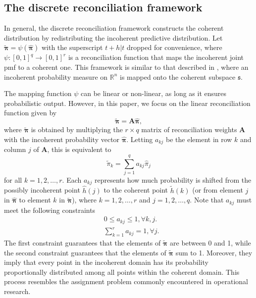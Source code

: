 \documentclass[a4paper,review,12pt,authoryear]{elsarticle}
\newcommand{\bpi}{\bm{\pi}}
\begin{document}
    \subsection{The discrete reconciliation framework}
    
    In general, the discrete reconciliation framework constructs the coherent distribution by redistributing the incoherent predictive distribution. 
    Let $\tilde{\bpi} = \psi(\hat{\bpi})$ with the superscript $t+h|t$ dropped for convenience, where $\psi:[0,1]^q \rightarrow [0,1]^r$ is a reconciliation function that maps the incoherent joint pmf to a coherent one. 
    This framework is similar to that described in \cite{panagiotelisProbabilisticForecastReconciliation2022}, where an incoherent probability measure on $\mathbb{R}^n$ is mapped onto the coherent subspace $\mathfrak{s}$.

    The mapping function $\psi$ can be linear or non-linear, as long as it ensures probabilistic output. 
    However, in this paper, we focus on the linear reconciliation function given by
    \begin{equation}
      \label{eq:framework}
    \tilde{\bpi}=\bm{A}\hat{\bpi},
    \end{equation}
    where $\tilde{\bpi}$ is obtained by multiplying the $r \times q$ matrix of reconciliation weights $\bm{A}$ with the incoherent probability vector $\hat{\bpi}$. Letting $a_{kj}$ be the element in row $k$ and column $j$ of $\bm{A}$, this is equivalent to
    \[
      \tilde{\pi}_k=\sum\limits_{j=1}^q a_{kj}\hat{{\pi}}_j
    \]
    for all $k = 1, 2, \dots, r$. 
    Each $a_{kj}$ represents how much probability is shifted from the possibly incoherent point $\hat{h}(j)$ to the coherent point $\tilde{h}(k)$ (or from element $j$ in $\hat{\bpi}$ to element $k$ in $\tilde{\bpi}$), where  $k = 1, 2, \dots, r$ and  $j = 1, 2, \dots, q$. Note that $a_{kj}$ must meet the following constraints
    \begin{align*}
    &0\leq a_{kj} \leq 1 ,\forall k, j.\\ 
    &\sum\limits_{k=1}^r a_{kj} = 1 ,\forall j. 
    \end{align*}
    The first constraint guarantees that the elements of $\tilde{\bpi}$ are between 0 and 1, while the second constraint guarantees that the elements of $\tilde{\bpi}$ sum to 1.
    Moreover, they imply that every point in the incoherent domain has its probability proportionally distributed among all points  within the coherent domain. 
    This process resembles the assignment problem commonly encountered in operational research.
    
\end{document}
